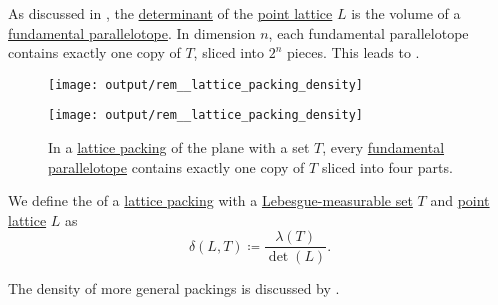 \begin{remark}\label{rem:lattice_packing_density}
  As discussed in , the \hyperref[def:point_lattice_determinant]{determinant} of the \hyperref[def:point_lattice]{point lattice} \( L \) is the volume of a \hyperref[def:fundamental_parallelotope]{fundamental parallelotope}. In dimension \( n \), each fundamental parallelotope contains exactly one copy of \( T \), sliced into \( 2^n \) pieces. This leads to .

  \begin{figure}[!ht]
    \begin{subcaptionblock}{0.45\linewidth}
      \centering
      \texttt{[image: output/rem\_\_lattice\_packing\_density]}
    \end{subcaptionblock}
    \hfill
    \begin{subcaptionblock}{0.45\linewidth}
      \centering
      \texttt{[image: output/rem\_\_lattice\_packing\_density]}
    \end{subcaptionblock}
    \caption{In a \hyperref[def:lattice_packing]{lattice packing} of the plane with a set \( T \), every \hyperref[def:fundamental_parallelotope]{fundamental parallelotope} contains exactly one copy of \( T \) sliced into four parts.}\label{fig:rem:lattice_packing_density}
  \end{figure}
\end{remark}

\begin{definition}\label{def:lattice_packing_density}
  We define the  of a \hyperref[def:lattice_packing]{lattice packing} with a \hyperref[def:lebesgue_measure]{Lebesgue-measurable set} \( T \) and \hyperref[def:point_lattice]{point lattice} \( L \) as
  \begin{equation}\label{eq:def:lattice_packing_density}
    \delta(L, T) \coloneqq \frac {\lambda(T)} {\det(L)}.
  \end{equation}
\end{definition}
\begin{comments}
  \item The density of more general packings is discussed by .
\end{comments}

